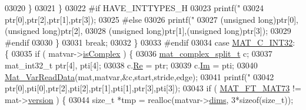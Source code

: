 \begin{DoxyCode}
{{{{{{{{{{{{{{{{{{{{{{{{{{{{{{{{{{03020                             \}
03021                         \}
03022 \textcolor{preprocessor}{#if HAVE\_INTTYPES\_H}
03023                         printf(\textcolor{stringliteral}{"%
03024                             ptr[0],ptr[2],ptr[1],ptr[3]);
03025 \textcolor{preprocessor}{#else}
03026                         printf(\textcolor{stringliteral}{"%
03027                             (\textcolor{keywordtype}{unsigned} \textcolor{keywordtype}{long})ptr[0],(\textcolor{keywordtype}{unsigned} \textcolor{keywordtype}{long})ptr[2],
03028                             (\textcolor{keywordtype}{unsigned} \textcolor{keywordtype}{long})ptr[1],(\textcolor{keywordtype}{unsigned} \textcolor{keywordtype}{long})ptr[3]);
03029 \textcolor{preprocessor}{#endif}
03030                     \}
03031                     \textcolor{keywordflow}{break};
03032                 \}
03033 \textcolor{preprocessor}{#endif}
03034                 \textcolor{keywordflow}{case} \hyperlink{group___m_a_t_ggad4d60ae7b709fc81bfd744fb4c857c40adb44fc39694e3152ae5e69470a2fefe8}{MAT\_C\_INT32}: \{
03035                     \textcolor{keywordflow}{if} ( matvar->\hyperlink{group___m_a_t_aeb03b3a69f108dc05470b00443a43739}{isComplex} ) \{
03036                         \hyperlink{group___m_a_t_structmat__complex__split__t}{mat\_complex\_split\_t} c;
03037                         mat\_int32\_t ptr[4], pti[4];
03038                         c.\hyperlink{group___m_a_t_a484a93607508adac2bce53a0252e0325}{Re} = ptr;
03039                         c.\hyperlink{group___m_a_t_a7182d10b0d3598415887376065440946}{Im} = pti;
03040                         \hyperlink{group___m_a_t_ga1845000f4fc6252ec5ff11c4b9f0759f}{Mat\_VarReadData}(mat,matvar,&c,start,stride,edge);
03041                         printf(\textcolor{stringliteral}{"%
03042                             ptr[0],pti[0],ptr[2],pti[2],ptr[1],pti[1],ptr[3],pti[3]);
03043                         \textcolor{keywordflow}{if} ( \hyperlink{group___m_a_t_ggad03442b8378999189d510e3745c702b7a765c5d1d5038947646260dc82483517e}{MAT\_FT\_MAT73} != mat->\hyperlink{struct__mat__t_a729c2bc0afc97485057a5af425635b1a}{version} ) \{
03044                             \textcolor{keywordtype}{size\_t} *tmp = realloc(matvar->\hyperlink{group___m_a_t_a8e01234e1c862ce3472bb37f5a09b92c}{dims}, 3*\textcolor{keyword}{sizeof}(\textcolor{keywordtype}{size\_t}));
}}}}}}}}}}}}}}}}}}}}}}}}}}}}}}}}}}}}}
\end{DoxyCode}
